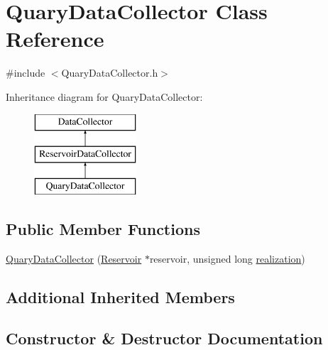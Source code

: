 \hypertarget{classQuaryDataCollector}{}\section{Quary\+Data\+Collector Class Reference}
\label{classQuaryDataCollector}


{\ttfamily \#include $<$Quary\+Data\+Collector.\+h$>$}

Inheritance diagram for Quary\+Data\+Collector\+:\begin{figure}[H]
\begin{center}
\leavevmode
\includegraphics[height=3.000000cm]{classQuaryDataCollector}
\end{center}
\end{figure}
\subsection*{Public Member Functions}
\begin{DoxyCompactItemize}
\item 
\mbox{\hyperlink{classQuaryDataCollector_af2f534feeca2a37104309a595d064cbd}{Quary\+Data\+Collector}} (\mbox{\hyperlink{classReservoir}{Reservoir}} $\ast$reservoir, unsigned long \mbox{\hyperlink{classDataCollector_a9ef2887466fe3123aa19ef956a219b96}{realization}})
\end{DoxyCompactItemize}
\subsection*{Additional Inherited Members}


\subsection{Constructor \& Destructor Documentation}
\mbox{\label{classQuaryDataCollector_af2f534feeca2a37104309a595d064cbd}} 
